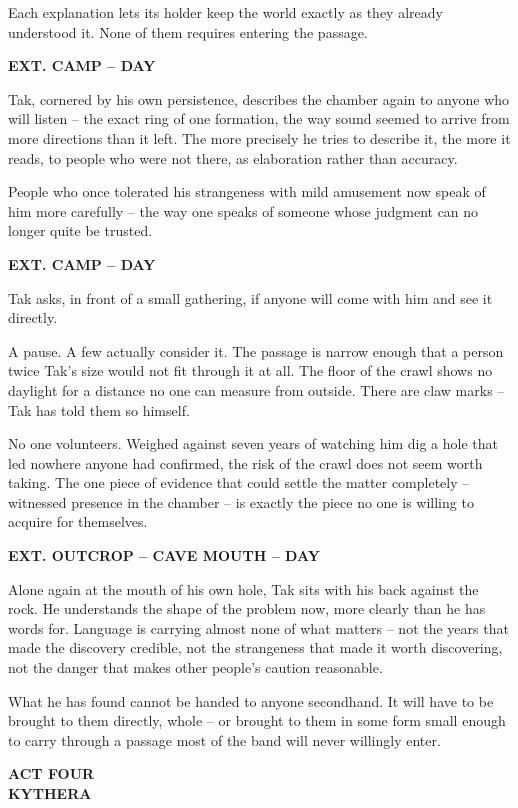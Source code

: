 \documentclass[12pt]{article}
\newcommand{\sceneheading}[1]{%
  \bigskip\noindent\textbf{#1}\par\smallskip
}
\newcommand{\action}[1]{%
  \noindent #1\par\medskip
}
\newcommand{\actbreak}[1]{%
  \clearpage\thispagestyle{empty}\vspace*{3in}
  \begin{center}{\Large\textbf{#1}}\end{center}
  \clearpage
}
\begin{document}
\action{Each explanation lets its holder keep the world exactly as they already understood it. None of them requires entering the passage.}

\sceneheading{EXT. CAMP -- DAY}

\action{Tak, cornered by his own persistence, describes the chamber again to anyone who will listen -- the exact ring of one formation, the way sound seemed to arrive from more directions than it left. The more precisely he tries to describe it, the more it reads, to people who were not there, as elaboration rather than accuracy.}

\action{People who once tolerated his strangeness with mild amusement now speak of him more carefully -- the way one speaks of someone whose judgment can no longer quite be trusted.}

\sceneheading{EXT. CAMP -- DAY}

\action{Tak asks, in front of a small gathering, if anyone will come with him and see it directly.}

\action{A pause. A few actually consider it. The passage is narrow enough that a person twice Tak's size would not fit through it at all. The floor of the crawl shows no daylight for a distance no one can measure from outside. There are claw marks -- Tak has told them so himself.}

\action{No one volunteers. Weighed against seven years of watching him dig a hole that led nowhere anyone had confirmed, the risk of the crawl does not seem worth taking. The one piece of evidence that could settle the matter completely -- witnessed presence in the chamber -- is exactly the piece no one is willing to acquire for themselves.}

\sceneheading{EXT. OUTCROP -- CAVE MOUTH -- DAY}

\action{Alone again at the mouth of his own hole, Tak sits with his back against the rock. He understands the shape of the problem now, more clearly than he has words for. Language is carrying almost none of what matters -- not the years that made the discovery credible, not the strangeness that made it worth discovering, not the danger that makes other people's caution reasonable.}

\action{What he has found cannot be handed to anyone secondhand. It will have to be brought to them directly, whole -- or brought to them in some form small enough to carry through a passage most of the band will never willingly enter.}

\actbreak{ACT FOUR\\ \large KYTHERA}
\end{document}
